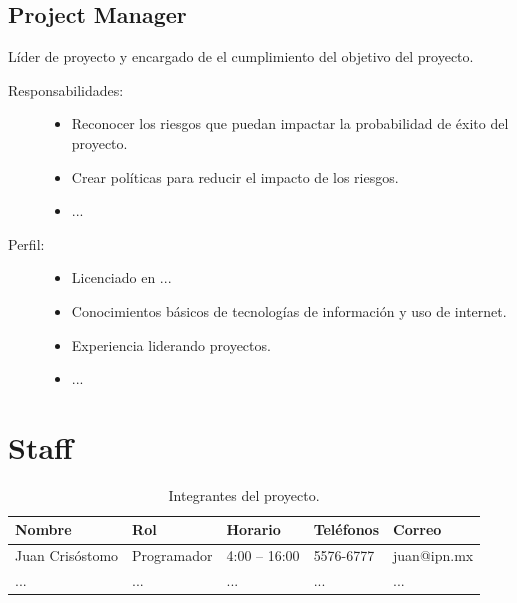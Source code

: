 \subsection{Project Manager}
	Líder de proyecto y encargado de el cumplimiento del objetivo del proyecto.

\begin{description}
	\item[Responsabilidades:] \cdtEmpty 	
    \begin{itemize}
    	\item Reconocer los riesgos que puedan impactar la probabilidad de éxito del proyecto.
		\item Crear políticas para reducir el impacto de los riesgos.
		\item ...
    \end{itemize}
	\item[Perfil:] \cdtEmpty	
    \begin{itemize}
       	\item Licenciado en ...
		\item Conocimientos básicos de tecnologías de información y uso de internet.
		\item Experiencia liderando proyectos.
		\item ...
    \end{itemize}
\end{description}

\section{Staff}


\begin{table}[hbtp!]
    \noindent\begin{tabular}{|p{}|p{}|p{}|p{}|p{}|}
    	\hline
    	{\bf Nombre} & {\bf Rol} & {\bf Horario} & {\bf Teléfonos} & {\bf Correo}\\
    	\hline
    	Juan Crisóstomo & Programador & 4:00 -- 16:00 & 5576-6777 & juan@ipn.mx \\
    	\hline
    	... & ... & ... & ... & ... \\
    	\hline
    \end{tabular}
	\caption{Integrantes del proyecto.}
	\label{tbl:staff}
\end{table}
